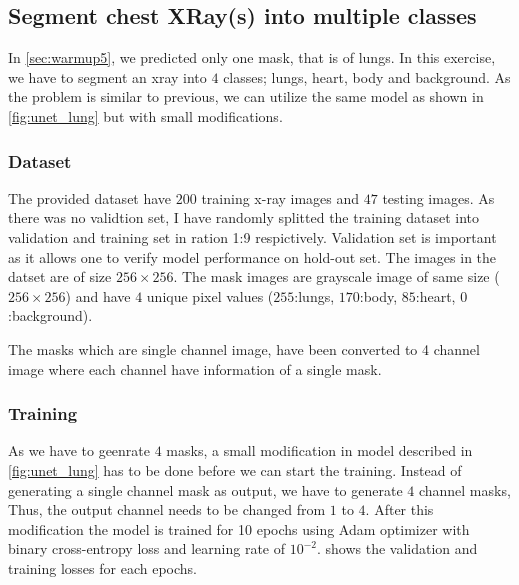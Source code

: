 \subsection{Segment chest XRay(s) into multiple classes}
\label{sec:warmup6}

    In \cref{sec:warmup5}, we predicted only one mask, that is of lungs. In this exercise, we have to segment an xray into $4$ classes; lungs, heart, body and background. As the problem is similar to previous, we can utilize the same model as shown in \cref{fig:unet_lung} but with small modifications. 

\subsubsection{Dataset}
    The provided dataset have $200$ training x-ray images and $47$ testing images. As there was no validtion set, I have randomly splitted the training dataset into validation and training set in ration 1:9 respictively. Validation set is important as it allows one to verify model performance on hold-out set. The images in the datset are of size $256 \times 256$. The mask images are grayscale image of same size ($256 \times 256$) and have $4$ unique pixel values ($255$:lungs, $170$:body, $85$:heart, $0$:background). 

    The masks which are single channel image, have been converted to 4 channel image where each channel have information of a single mask.
    

\subsubsection{Training}
 
    As we have to geenrate $4$ masks, a small modification in model described in \cref{fig:unet_lung} has to be done before we can start the training. Instead of generating a single channel mask as output, we have to generate $4$ channel masks, Thus, the output channel needs to be changed from $1$ to $4$. After this modification the model is trained for 10 epochs using Adam optimizer with binary cross-entropy loss and learning rate of $10^{-2}$.  shows the validation and training losses for each epochs. 

